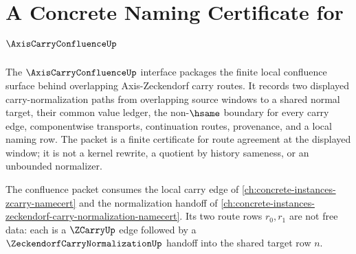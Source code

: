 \chapter{A Concrete Naming Certificate for $\AxisCarryConfluenceUp$}
\label{ch:concrete-instances-axis-carry-confluence-namecert}

The $\AxisCarryConfluenceUp$ interface packages the finite local confluence surface behind overlapping Axis-Zeckendorf carry routes. It records two displayed carry-normalization paths from overlapping source windows to a shared normal target, their common value ledger, the non-$\hsame$ boundary for every carry edge, componentwise transports, continuation routes, provenance, and a local naming row. The packet is a finite certificate for route agreement at the displayed window; it is not a kernel rewrite, a quotient by history sameness, or an unbounded normalizer.

The confluence packet consumes the local carry edge of \autoref{ch:concrete-instances-zcarry-namecert} and the normalization handoff of \autoref{ch:concrete-instances-zeckendorf-carry-normalization-namecert}. Its two route rows $r_0,r_1$ are not free data: each is a $\ZCarryUp$ edge followed by a $\ZeckendorfCarryNormalizationUp$ handoff into the shared target row $n$.

